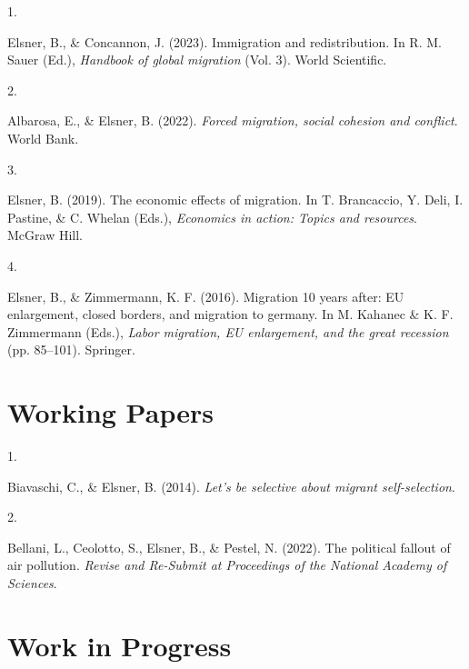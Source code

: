 \documentclass[10pt,a4paper,]{article}
\newlength{\cslhangindent}
\newlength{\csllabelwidth}
\newenvironment{CSLReferences}[2] %
 {\begin{list}{}{%
  \setlength{\itemindent}{0pt}
  \setlength{\leftmargin}{0pt}
  \setlength{\parsep}{0pt}
  \ifodd #1
   \setlength{\leftmargin}{\cslhangindent}
   \setlength{\itemindent}{-1\cslhangindent}
  \fi
  \setlength{\itemsep}{#2\baselineskip}}}
 {\end{list}}
\newcommand{\CSLLeftMargin}[1]{\parbox[t]{\csllabelwidth}{\strut#1\strut}}
\newcommand{\CSLRightInline}[1]{\parbox[t]{\linewidth - \csllabelwidth}{\strut#1\strut}}
\begin{document}
\hypertarget{refs-658742a7a57353d10df1ca5dbe9d164a}{}
\begin{CSLReferences}{0}{0}
\leavevmode{}%
\CSLLeftMargin{1. }%
\CSLRightInline{Elsner, B., \& Concannon, J. (2023). Immigration and
redistribution. In R. M. Sauer (Ed.), \emph{Handbook of global
migration} (Vol. 3). World Scientific.}

\leavevmode{}%
\CSLLeftMargin{2. }%
\CSLRightInline{Albarosa, E., \& Elsner, B. (2022). \emph{Forced
migration, social cohesion and conflict}. World Bank.}

\leavevmode{}%
\CSLLeftMargin{3. }%
\CSLRightInline{Elsner, B. (2019). The economic effects of migration. In
T. Brancaccio, Y. Deli, I. Pastine, \& C. Whelan (Eds.), \emph{Economics
in action: Topics and resources}. McGraw Hill.}

\leavevmode{}%
\CSLLeftMargin{4. }%
\CSLRightInline{Elsner, B., \& Zimmermann, K. F. (2016). Migration 10
years after: EU enlargement, closed borders, and migration to germany.
In M. Kahanec \& K. F. Zimmermann (Eds.), \emph{Labor migration, EU
enlargement, and the great recession} (pp. 85--101). Springer.}

\end{CSLReferences}

\hypertarget{working-papers}{%
\section{Working Papers}\label{working-papers}}

\hypertarget{refs-5bc1a56cf8e66da95d1af783c419c7d0}{}
\begin{CSLReferences}{0}{0}
\leavevmode{}%
\CSLLeftMargin{1. }%
\CSLRightInline{Biavaschi, C., \& Elsner, B. (2014). \emph{Let's be
selective about migrant self-selection}.}

\leavevmode{}%
\CSLLeftMargin{2. }%
\CSLRightInline{Bellani, L., Ceolotto, S., Elsner, B., \& Pestel, N.
(2022). The political fallout of air pollution. \emph{Revise and
Re-Submit at Proceedings of the National Academy of Sciences}.}

\end{CSLReferences}

\hypertarget{work-in-progress}{%
\section{Work in Progress}\label{work-in-progress}}
\end{document}
